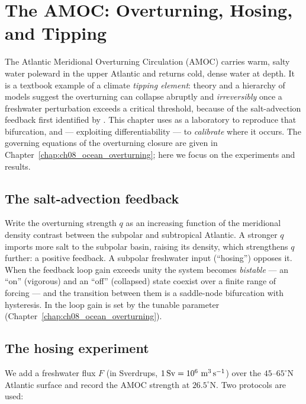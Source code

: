 \chapter{The AMOC: Overturning, Hosing, and Tipping}
\label{chap:ch17_amoc_tipping}

The Atlantic Meridional Overturning Circulation (AMOC) carries warm, salty water poleward in
the upper Atlantic and returns cold, dense water at depth. It is a textbook example of a climate
\emph{tipping element}: theory and a hierarchy of models suggest the overturning can collapse
abruptly and \emph{irreversibly} once a freshwater perturbation exceeds a critical threshold,
because of the salt-advection feedback first identified by \citet{stommel1961}. This chapter
uses \model{} as a laboratory to reproduce that bifurcation, and --- exploiting
differentiability --- to \emph{calibrate} where it occurs. The governing equations of the
overturning closure are given in Chapter~\ref{chap:ch08_ocean_overturning}; here we focus on the
experiments and results.

\section{The salt-advection feedback}

Write the overturning strength $q$ as an increasing function of the meridional density contrast
between the subpolar and subtropical Atlantic. A stronger $q$ imports more salt to the subpolar
basin, raising its density, which strengthens $q$ further: a positive feedback. A subpolar
freshwater input (``hosing'') opposes it. When the feedback loop gain exceeds unity the system
becomes \emph{bistable} --- an ``on'' (vigorous) and an ``off'' (collapsed) state coexist over a
finite range of forcing --- and the transition between them is a saddle-node bifurcation with
hysteresis. In \model{} the loop gain is set by the tunable parameter 
(Chapter~\ref{chap:ch08_ocean_overturning}).

\section{The hosing experiment}

We add a freshwater flux $F$ (in Sverdrups, $1\,\mathrm{Sv}=10^6~\mathrm{m^3\,s^{-1}}$) over the
$45$--$65^\circ$N Atlantic surface and record the AMOC strength at $26.5^\circ$N. Two protocols
are used:

